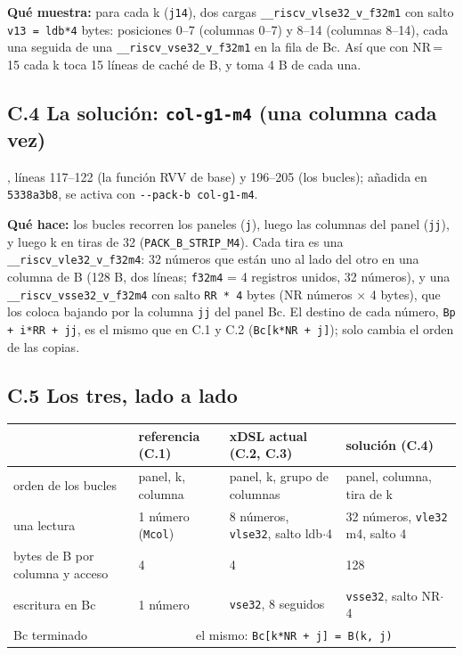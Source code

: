 \textbf{Qué muestra:} para cada k (\texttt{j14}), dos cargas \texttt{\_\_riscv\_vlse32\_v\_f32m1} con salto \texttt{v13 = ldb*4}
bytes: posiciones 0--7 (columnas 0--7) y 8--14 (columnas 8--14), cada una seguida de una \texttt{\_\_riscv\_vse32\_v\_f32m1} en la
fila de Bc. Así que con NR\,=\,15 cada k toca 15 líneas de caché de B, y toma 4 B de cada una.

\subsection*{C.4 La solución: \texttt{col-g1-m4} (una columna cada vez)}
, líneas 117--122 (la función RVV de base) y 196--205 (los bucles);
añadida en \texttt{5338a3b8}, se activa con \texttt{-{}-pack-b col-g1-m4}.

\textbf{Qué hace:} los bucles recorren los paneles (\texttt{j}), luego las columnas del panel (\texttt{jj}), y luego k en tiras de 32
(\texttt{PACK\_B\_STRIP\_M4}). Cada tira es una \texttt{\_\_riscv\_vle32\_v\_f32m4}: 32 números que están uno al lado del otro en una
columna de B (128 B, dos líneas; \texttt{f32m4} = 4 registros unidos, 32 números), y una \texttt{\_\_riscv\_vsse32\_v\_f32m4} con
salto \texttt{RR * 4} bytes (NR números $\times$ 4 bytes), que los coloca bajando por la columna \texttt{jj} del panel Bc. El destino de
cada número, \texttt{Bp + i*RR + jj}, es el mismo que en C.1 y C.2 (\texttt{Bc[k*NR + j]}); solo cambia el orden de las copias.

\subsection*{C.5 Los tres, lado a lado}
\begin{center}\footnotesize\setlength{\tabcolsep}{4pt}
\begin{tabular}{@{}llll@{}}
\toprule
 & referencia (C.1) & xDSL actual (C.2, C.3) & solución (C.4) \\
\midrule
orden de los bucles & panel, k, columna & panel, k, grupo de columnas & panel, columna, tira de k \\
una lectura & 1 número (\texttt{Mcol}) & 8 números, \texttt{vlse32}, salto ldb$\cdot$4 & 32 números, \texttt{vle32} m4, salto 4 \\
bytes de B por columna y acceso & 4 & 4 & 128 \\
escritura en Bc & 1 número & \texttt{vse32}, 8 seguidos & \texttt{vsse32}, salto NR$\cdot$4 \\
Bc terminado & \multicolumn{3}{c}{el mismo: \texttt{Bc[k*NR + j] = B(k, j)}} \\
\bottomrule
\end{tabular}
\end{center}

